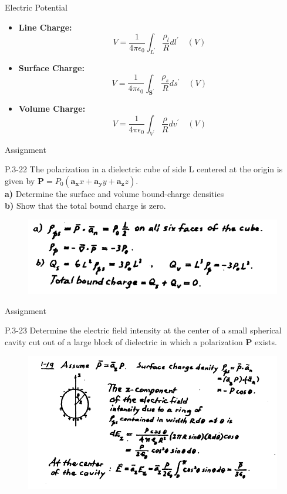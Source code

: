 \documentclass[xcolor={dvipsnames}]{beamer}
\begin{document}
\begin{frame}{Electric Potential}
\begin{itemize}
\item \textbf{Line Charge:}
\[
V=\frac{1}{4 \pi \epsilon_{0}} \int_{L^{\prime}} \frac{\rho_{l}}{R} dl^{\prime} \quad(V)
\]
\item \textbf{Surface Charge:}
\[
V=\frac{1}{4 \pi \epsilon_{0}} \int_{\mathbf{S}^{\prime}}  \frac{\rho_{s}}{{R}} d s^{\prime} \quad(V)
\]
\item \textbf{Volume Charge:}
\[
V=\frac{1}{4 \pi \epsilon_{0}} \int_{V^{\prime}} \frac{\rho}{R} d v^{\prime} \quad(V)
\]
\end{itemize}
\end{frame}
\begin{frame}{Assignment}
\begin{block}{P.3-22}
The polarization in a dielectric cube of side L centered at the origin is given by $\mathbf{P}=P_0(\mathbf{a_x}x+\mathbf{a_y}y+\mathbf{a_z}z)$.\\
\textbf{a)} Determine the surface and volume bound-charge densities\\
\textbf{b)} Show that the total bound charge is zero.\\

\end{block}
\pause
\begin{figure}[H]
	\centering
	\includegraphics[width=0.9\linewidth]{3_3.png}
\end{figure}
\end{frame}
\begin{frame}{Assignment}
\begin{block}{P.3-23}
Determine the electric field intensity at the center of a small spherical cavity cut out of a large block of dielectric in which a polarization \textbf{P} exists.

\end{block}
\pause
\begin{figure}[H]
	\centering
	\includegraphics[width=0.8\linewidth]{3_4.png}
\end{figure}
\end{frame}
\end{document}
